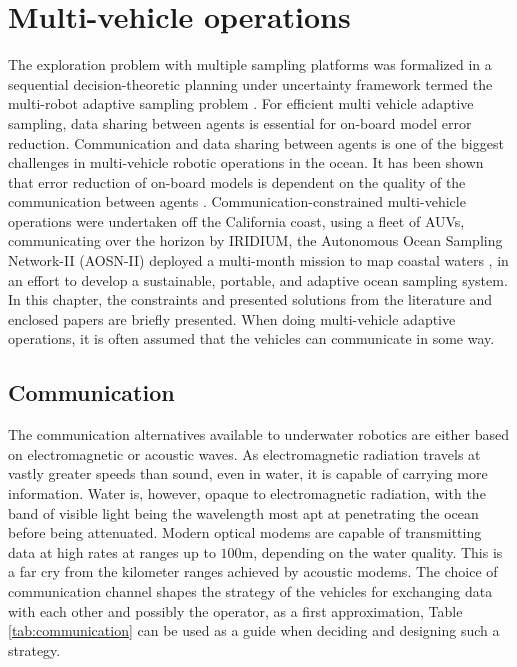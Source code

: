 \chapter{Multi-vehicle operations}
\label{chapter:multivehicle}


The exploration problem with multiple sampling platforms was formalized in a sequential decision-theoretic planning under uncertainty framework termed the multi-robot adaptive sampling problem \cite{low2009multi}.  For efficient multi vehicle adaptive sampling, data sharing between agents is essential for on-board model error reduction\cite{kemna2016adaptive,berget2022adaptive}. Communication and data sharing between agents is one of the biggest challenges in multi-vehicle robotic operations in the ocean. It has been shown that error reduction of on-board models is dependent on the quality of the communication between agents \cite{kemna2016adaptive}. Communication-constrained multi-vehicle operations were undertaken off the California coast, using a fleet of AUVs, communicating over the horizon by IRIDIUM\textsuperscript{\textregistered}\cite{maine1995overview,pratt1999operational}, the Autonomous Ocean Sampling Network-II (AOSN-II) deployed a multi-month mission to map coastal waters \cite{leonard2007collective}, in an effort to develop a sustainable, portable, and adaptive ocean sampling system. In this chapter, the constraints and presented solutions from the literature and enclosed papers are briefly presented. When doing multi-vehicle adaptive operations, it is often assumed that the vehicles can 
communicate in some way. 


\section{Communication}
The communication alternatives available to underwater robotics are either based on electromagnetic or acoustic waves. As electromagnetic radiation travels at vastly greater speeds than sound, even in water, it is capable of carrying more information. Water is, however, opaque to electromagnetic radiation, with the band of visible light being the wavelength most apt at penetrating the ocean before being attenuated. Modern optical modems \cite{leon2017new} are capable of transmitting data at high rates at ranges up to $100$m, depending on the water quality. This is a far cry from the kilometer ranges achieved by acoustic modems. The choice of communication channel shapes the strategy of the vehicles for exchanging data with each other and possibly the operator, as a first approximation, Table \ref{tab:communication} can be used as a guide when deciding and designing such a strategy. 

